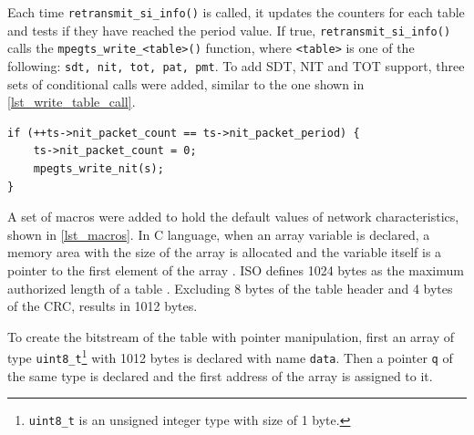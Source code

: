 \documentclass[
	12pt,				%
	openright,			%
	twoside,			%
	a4paper,			%
	brazil,
	french,				%
	english
	]{abntex2}
\begin{document}
Each time \texttt{retransmit\hspace{0.1mm}\_\hspace{0.1mm}si\hspace{0.1mm}\_\hspace{0.1mm}info()} is called, it updates the counters for each table and tests if they have reached the period value. If true, \texttt{retransmit\hspace{0.1mm}\_\hspace{0.1mm}si\hspace{0.1mm}\_\hspace{0.1mm}info()} calls the \texttt{mpegts\hspace{0.1mm}\_\hspace{0.1mm}write\hspace{0.1mm}\_\hspace{0.1mm}<table>()} function, where \texttt{<table>} is one of the following: \texttt{sdt, nit, tot, pat, pmt}. To add SDT, NIT and TOT support, three sets of conditional calls were added, similar to the one shown in \autoref{lst_write_table_call}.

\begin{minipage}{\linewidth}
\begin{lstlisting}[caption={Conditional call to \texttt{mpegts\hspace{0.1mm}\_\hspace{0.1mm}write\hspace{0.1mm}\_\hspace{0.1mm}nit()}.}, label={lst_write_table_call}]
if (++ts->nit_packet_count == ts->nit_packet_period) {
    ts->nit_packet_count = 0;
    mpegts_write_nit(s);
}
\end{lstlisting}
\end{minipage}

A set of macros were added to hold the default values of network characteristics, shown in \autoref{lst_macros}. In C language, when an array variable is declared, a memory area with the size of the array is allocated and the variable itself is a pointer to the first element of the array . ISO defines 1024 bytes as the maximum authorized length of a table . Excluding 8 bytes of the table header and 4 bytes of the CRC, results in 1012 bytes.

To create the bitstream of the table with pointer manipulation, first an array of type \texttt{uint8\hspace{0.1mm}\_\hspace{0.1mm}t}\footnote{\texttt{uint8\hspace{0.1mm}\_\hspace{0.1mm}t} is an unsigned integer type with size of 1 byte.} with 1012 bytes is declared with name \texttt{data}. Then a pointer \texttt{q} of the same type is declared and the first address of the array is assigned to it.
\end{document}
